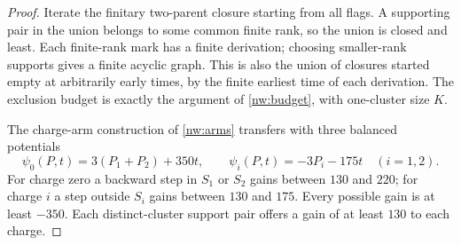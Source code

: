 \begin{proof}
Iterate the finitary two-parent closure starting from all flags. A supporting pair in the union belongs to some common finite rank, so the union is closed and least. Each finite-rank mark has a finite derivation; choosing smaller-rank supports gives a finite acyclic graph. This is also the union of closures started empty at arbitrarily early times, by the finite earliest time of each derivation. The exclusion budget is exactly the argument of \cref{nw:budget}, with one-cluster size $K$.

The charge-arm construction of \cref{nw:arms} transfers with three balanced potentials
\[
 \psi_0(P,t)=3(P_1+P_2)+350t,\qquad
 \psi_i(P,t)=-3P_i-175t\quad(i=1,2).
\]
For charge zero a backward step in $S_1$ or $S_2$ gains between $130$ and $220$; for charge $i$ a step outside $S_i$ gains between $130$ and $175$. Every possible gain is at least $-350$. Each distinct-cluster support pair offers a gain of at least $130$ to each charge.


\end{proof}
